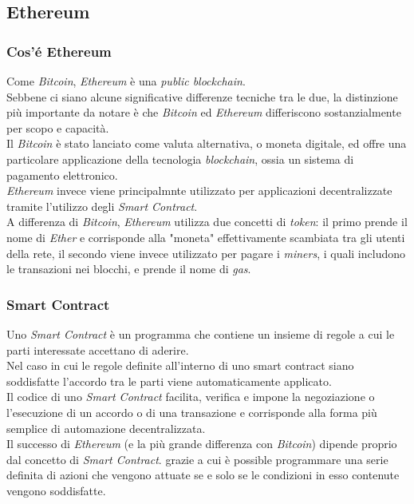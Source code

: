 \documentclass[11pt]{thesistemp}
\begin{document}
\pagebreak
\subsection{Ethereum}

\subsubsection{Cos'é Ethereum}

Come \textit{Bitcoin}, \textit{Ethereum} è una \textit{public blockchain}.\\
Sebbene ci siano alcune significative differenze tecniche tra le due, la distinzione più importante da notare è che \textit{Bitcoin} ed \textit{Ethereum} differiscono sostanzialmente per scopo e capacità.\\
Il \textit{Bitcoin} è stato lanciato come valuta alternativa, o moneta digitale, ed offre una particolare applicazione della tecnologia \textit{blockchain}, ossia un sistema di pagamento elettronico.\\
\textit{Ethereum} invece viene principalmnte utilizzato per applicazioni decentralizzate tramite l'utilizzo degli \textit{Smart Contract}.\\
A differenza di \textit{Bitcoin}, \textit{Ethereum} utilizza due concetti di \textit{token}: il primo prende il nome di \textit{Ether} e corrisponde alla "moneta" effettivamente scambiata tra gli utenti della rete, il secondo viene invece utilizzato per pagare i \textit{miners}, i quali includono le transazioni nei blocchi, e prende il nome di \textit{gas}.

\subsubsection{Smart Contract}

Uno \textit{Smart Contract} è un programma che contiene un insieme di regole a cui le parti interessate accettano di aderire.\\
Nel caso in cui le regole definite all'interno di uno smart contract siano soddisfatte l'accordo tra le parti viene automaticamente applicato.\\
Il codice di uno \textit{Smart Contract} facilita, verifica e impone la negoziazione o l'esecuzione di un accordo o di una transazione e corrisponde alla forma più semplice di automazione decentralizzata.\\
Il successo di \textit{Ethereum} (e la più grande differenza con \textit{Bitcoin}) dipende proprio dal concetto di \textit{Smart Contract}. grazie a cui è possible programmare una serie definita di azioni che vengono attuate se e solo se le condizioni in esso contenute vengono soddisfatte.
\end{document}
